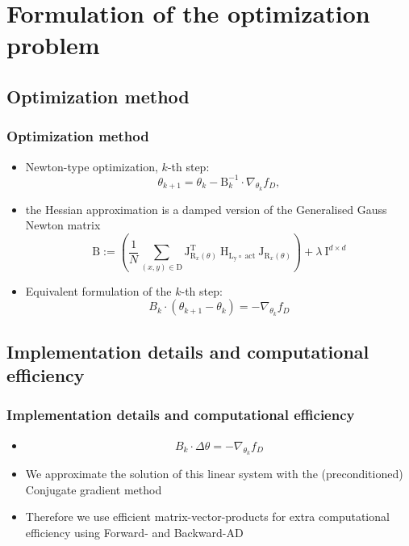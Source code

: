 


\beamertemplatenavigationsymbolsempty{}


\section{Formulation of the optimization problem}

  \subsection{Optimization method}
  \begin{frame}
  \frametitle{Optimization method}
  \begin{itemize}
  	\item Newton-type optimization, $k$-th step: 
  	$$\theta_{k+1} = \theta_{k} - \mathrm{B}_{k}^{-1}\cdot\nabla_{\theta_{k}} f_{D},$$%
  	\pause
  	\item[] the Hessian approximation is  a damped version of the Generalised Gauss Newton matrix 
  	$$\mathrm{B} := \left(\frac{1}{N}\sum_{(x, y)\in\mathrm{D}}^{}\mathrm{J}_{\mathrm{R}_{x}(\theta)}^{\mathrm{T}}\:\mathrm{H}_{\mathrm{L_{y}\circ\:\text{act}}}\:\mathrm{J}_{\mathrm{R}_{x}(\theta)}\right) + \lambda\:\mathrm{I}^{d\times d} $$
  	\item Equivalent formulation of the $k$-th step:
  	$$B_{k}\cdot (\theta_{k+1} - \theta_{k}) = -\nabla_{\theta_{k}}f_{D}$$
  \end{itemize}
\end{frame}

\subsection{Implementation details and computational efficiency}
\begin{frame}
\frametitle{Implementation details and computational efficiency}
\begin{itemize}
	\item[] $$B_{k}\cdot \Delta\theta = -\nabla_{\theta_{k}}f_{D}$$
	\item We approximate the solution of this linear system with the (preconditioned) Conjugate gradient method
	\pause
	\item Therefore we use efficient matrix-vector-products for extra computational efficiency using Forward- and Backward-AD
\end{itemize}
\end{frame}
  
